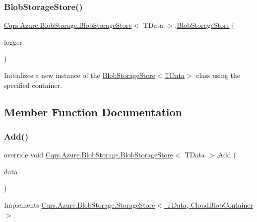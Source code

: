 \subsubsection{\texorpdfstring{Blob\+Storage\+Store()}{BlobStorageStore()}}
{\footnotesize\ttfamily \hyperlink{classCqrs_1_1Azure_1_1BlobStorage_1_1BlobStorageStore}{Cqrs.\+Azure.\+Blob\+Storage.\+Blob\+Storage\+Store}$<$ T\+Data $>$.\hyperlink{classCqrs_1_1Azure_1_1BlobStorage_1_1BlobStorageStore}{Blob\+Storage\+Store} (\begin{DoxyParamCaption}\item[{I\+Logger}]{logger }\end{DoxyParamCaption})}



Initializes a new instance of the \hyperlink{classCqrs_1_1Azure_1_1BlobStorage_1_1BlobStorageStore_ae1979c63b97dea8e207dda7b0087ee6b_ae1979c63b97dea8e207dda7b0087ee6b}{Blob\+Storage\+Store$<$\+T\+Data$>$} class using the specified container. 



\subsection{Member Function Documentation}
\mbox{\label{classCqrs_1_1Azure_1_1BlobStorage_1_1BlobStorageStore_a527ef0e0d39f9e01f4112b6bc90129b2_a527ef0e0d39f9e01f4112b6bc90129b2}} 
\subsubsection{\texorpdfstring{Add()}{Add()}}
{\footnotesize\ttfamily override void \hyperlink{classCqrs_1_1Azure_1_1BlobStorage_1_1BlobStorageStore}{Cqrs.\+Azure.\+Blob\+Storage.\+Blob\+Storage\+Store}$<$ T\+Data $>$.Add (\begin{DoxyParamCaption}\item[{T\+Data}]{data }\end{DoxyParamCaption})\hspace{0.3cm}{\ttfamily [virtual]}}



Implements \hyperlink{classCqrs_1_1Azure_1_1BlobStorage_1_1StorageStore_af56bdbd7fa6650aaef5c0bab9ed55f1a_af56bdbd7fa6650aaef5c0bab9ed55f1a}{Cqrs.\+Azure.\+Blob\+Storage.\+Storage\+Store$<$ T\+Data, Cloud\+Blob\+Container $>$}.

